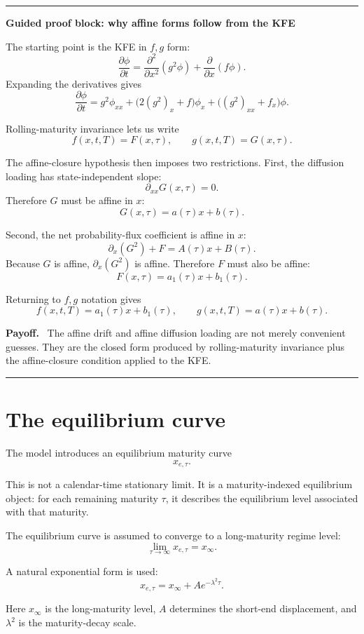 \documentclass[11pt]{article}
\theoremstyle{plainbreak}
\newenvironment{proofblock}[1]{%
    \vspace{0.5em}\hrule\vspace{0.7em}%
    {\bfseries Guided proof block: #1}\par\vspace{0.2em}%
}{%
    \vspace{0.5em}\hrule\vspace{0.7em}%
}
\newenvironment{takeaway}{%
    \vspace{0.4em}\noindent\textbf{Payoff.}\ }{\par\vspace{0.4em}}
\begin{document}
\begin{proofblock}{why affine forms follow from the KFE}
The starting point is the KFE in \(f,g\) form:
\[
\frac{\partial \phi}{\partial t}
=
\frac{\partial^2}{\partial x^2}(g^2\phi)
+
\frac{\partial}{\partial x}(f\phi).
\]
Expanding the derivatives gives
\[
\frac{\partial \phi}{\partial t}
=
g^2\phi_{xx}
+
\bigl(2(g^2)_x+f\bigr)\phi_x
+
\bigl((g^2)_{xx}+f_x\bigr)\phi.
\]

Rolling-maturity invariance lets us write
\[
f(x,t,T)=F(x,\tau), \qquad g(x,t,T)=G(x,\tau).
\]

The affine-closure hypothesis then imposes two restrictions. First, the diffusion loading has state-independent slope:
\[
\partial_{xx}G(x,\tau)=0.
\]
Therefore \(G\) must be affine in \(x\):
\[
G(x,\tau)=a(\tau)x+b(\tau).
\]

Second, the net probability-flux coefficient is affine in \(x\):
\[
\partial_x(G^2)+F=A(\tau)x+B(\tau).
\]
Because \(G\) is affine, \(\partial_x(G^2)\) is affine. Therefore \(F\) must also be affine:
\[
F(x,\tau)=a_1(\tau)x+b_1(\tau).
\]

Returning to \(f,g\) notation gives
\[
f(x,t,T)=a_1(\tau)x+b_1(\tau),
\qquad
 g(x,t,T)=a(\tau)x+b(\tau).
\]

\begin{takeaway}
The affine drift and affine diffusion loading are not merely convenient guesses. They are the closed form produced by rolling-maturity invariance plus the affine-closure condition applied to the KFE.
\end{takeaway}
\end{proofblock}

\section{The equilibrium curve}

The model introduces an equilibrium maturity curve
\[
x_{e,\tau}.
\]

This is not a calendar-time stationary limit. It is a maturity-indexed equilibrium object: for each remaining maturity \(\tau\), it describes the equilibrium level associated with that maturity.

The equilibrium curve is assumed to converge to a long-maturity regime level:
\[
\lim_{\tau\to\infty}x_{e,\tau}=x_\infty.
\]

A natural exponential form is used:
\[
x_{e,\tau}=x_\infty+A e^{-\lambda^2\tau}.
\]

Here \(x_\infty\) is the long-maturity level, \(A\) determines the short-end displacement, and \(\lambda^2\) is the maturity-decay scale.
\end{document}
